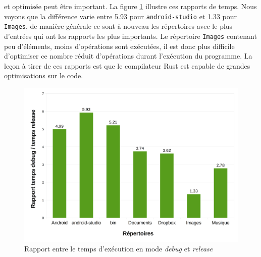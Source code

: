 et optimisée peut être important. La figure \ref{histo2} illustre ces rapports de temps. Nous 
voyons que la différence varie entre 5.93 pour \texttt{android-studio} et 1.33 pour 
\texttt{Images}, de manière générale ce sont à nouveau les répertoires 
avec le plus d'entrées qui ont les rapports les plus importants. Le répertoire \texttt{Images} 
contenant peu d'éléments, moins d'opérations sont exécutées, il est donc plus difficile d'optimiser ce nombre 
réduit d'opérations durant l'exécution du programme. La leçon à tirer de ces rapports est 
que le compilateur Rust est capable de grandes optimisations sur le code.
\begin{figure}
    \begin{center}
        \includegraphics[width=1\textwidth]{images/histo2.png}
    \end{center}
    \caption{Rapport entre le temps d'exécution en mode \textit{debug} et \textit{release}}
    \label{histo2}
\end{figure}

